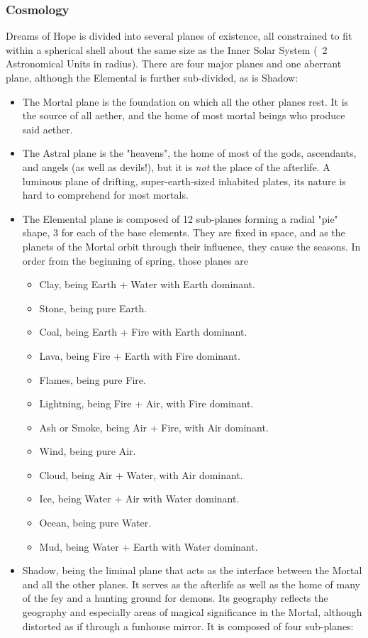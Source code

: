 \subsubsection{Cosmology}
Dreams of Hope is divided into several planes of existence, all constrained to fit within a spherical shell about the same size as the Inner Solar System (~2 Astronomical Units in radius). There are four major planes and one aberrant plane, although the Elemental is further sub-divided, as is Shadow:
\begin{itemize}
	\item The Mortal plane is the foundation on which all the other planes rest. It is the source of all aether, and the home of most mortal beings who produce said aether.
	\item The Astral plane is the "heavens", the home of most of the gods, ascendants, and angels (as well as devils!), but it is \textit{not} the place of the afterlife. A luminous plane of drifting, super-earth-sized inhabited plates, its nature is hard to comprehend for most mortals.
	\item The Elemental plane is composed of 12 sub-planes forming a radial "pie" shape, 3 for each of the base elements. They are fixed in space, and as the planets of the Mortal orbit through their influence, they cause the seasons. In order from the beginning of spring, those planes are
	\begin{itemize}
		\item Clay, being Earth + Water with Earth dominant.
		\item Stone, being pure Earth.
		\item Coal, being Earth + Fire with Earth dominant.
		\item Lava, being Fire + Earth with Fire dominant.
		\item Flames, being pure Fire.
		\item Lightning, being Fire + Air, with Fire dominant.
		\item Ash or Smoke, being Air + Fire, with Air dominant.
		\item Wind, being pure Air.
		\item Cloud, being Air + Water, with Air dominant.
		\item Ice, being Water + Air with Water dominant.
		\item Ocean, being pure Water.
		\item Mud, being Water + Earth with Water dominant.
	\end{itemize}
	\item Shadow, being the liminal plane that acts as the interface between the Mortal and all the other planes. It serves as the afterlife as well as the home of many of the fey and a hunting ground for demons. Its geography reflects the geography and especially areas of magical significance in the Mortal, although distorted as if through a funhouse mirror. It is composed of four sub-planes:

\end{itemize}
